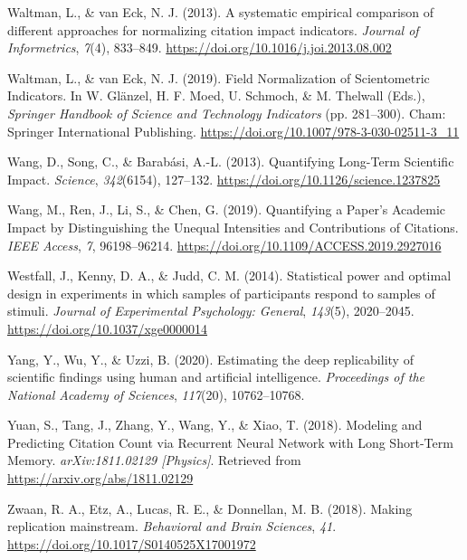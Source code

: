 \documentclass[
  english,
  jou,floatsintext]{apa6}
\newlength{\cslhangindent}
\newlength{\cslentryspacingunit} %
\newenvironment{CSLReferences}[2] %
 {%
  \setlength{\parindent}{0pt}
  \ifodd #1
  \let\oldpar\par
  \def\par{\hangindent=\cslhangindent\oldpar}
  \fi
  \setlength{\parskip}{#2\cslentryspacingunit}
 }%
 {}
\begin{document}
\begin{CSLReferences}{1}{0}
\leavevmode{}%
Waltman, L., \& van Eck, N. J. (2013). A systematic empirical comparison of different approaches for normalizing citation impact indicators. \emph{Journal of Informetrics}, \emph{7}(4), 833--849. \url{https://doi.org/10.1016/j.joi.2013.08.002}

\leavevmode{}%
Waltman, L., \& van Eck, N. J. (2019). Field {Normalization} of {Scientometric Indicators}. In W. Glänzel, H. F. Moed, U. Schmoch, \& M. Thelwall (Eds.), \emph{Springer {Handbook} of {Science} and {Technology Indicators}} (pp. 281--300). {Cham}: {Springer International Publishing}. \url{https://doi.org/10.1007/978-3-030-02511-3_11}

\leavevmode{}%
Wang, D., Song, C., \& Barabási, A.-L. (2013). Quantifying {Long}-{Term Scientific Impact}. \emph{Science}, \emph{342}(6154), 127--132. \url{https://doi.org/10.1126/science.1237825}

\leavevmode{}%
Wang, M., Ren, J., Li, S., \& Chen, G. (2019). Quantifying a {Paper}'s {Academic Impact} by {Distinguishing} the {Unequal Intensities} and {Contributions} of {Citations}. \emph{IEEE Access}, \emph{7}, 96198--96214. \url{https://doi.org/10.1109/ACCESS.2019.2927016}

\leavevmode{}%
Westfall, J., Kenny, D. A., \& Judd, C. M. (2014). Statistical power and optimal design in experiments in which samples of participants respond to samples of stimuli. \emph{Journal of Experimental Psychology: General}, \emph{143}(5), 2020--2045. \url{https://doi.org/10.1037/xge0000014}

\leavevmode{}%
Yang, Y., Wu, Y., \& Uzzi, B. (2020). Estimating the deep replicability of scientific findings using human and artificial intelligence. \emph{Proceedings of the National Academy of Sciences}, \emph{117}(20), 10762--10768.

\leavevmode{}%
Yuan, S., Tang, J., Zhang, Y., Wang, Y., \& Xiao, T. (2018). Modeling and {Predicting Citation Count} via {Recurrent Neural Network} with {Long Short}-{Term Memory}. \emph{arXiv:1811.02129 {[}Physics{]}}. Retrieved from \url{https://arxiv.org/abs/1811.02129}

\leavevmode{}%
Zwaan, R. A., Etz, A., Lucas, R. E., \& Donnellan, M. B. (2018). Making replication mainstream. \emph{Behavioral and Brain Sciences}, \emph{41}. \url{https://doi.org/10.1017/S0140525X17001972}

\end{CSLReferences}
\end{document}
